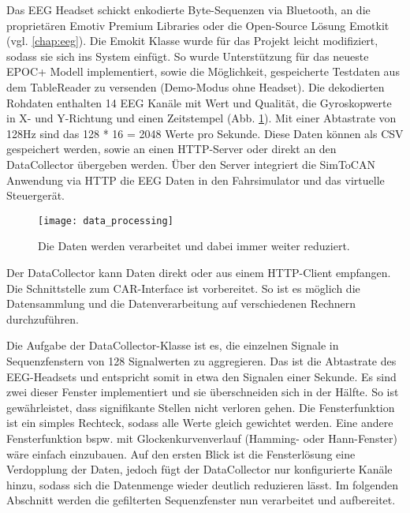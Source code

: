 \label{sec:fetching}
 
Das EEG Headset schickt enkodierte Byte-Sequenzen via Bluetooth, an die proprietären Emotiv Premium Libraries oder die Open-Source Lösung Emotkit (vgl. \ref{chap:eeg}). Die Emokit Klasse wurde für das Projekt leicht modifiziert, sodass sie sich ins System einfügt. So wurde Unterstützung für das neueste EPOC+ Modell implementiert, sowie die Möglichkeit, gespeicherte Testdaten aus dem TableReader zu versenden (Demo-Modus ohne Headset). 
Die dekodierten Rohdaten enthalten 14 EEG Kanäle mit Wert und Qualität, die Gyroskopwerte in X- und Y-Richtung und einen Zeitstempel (Abb. \ref{fig:data_processing}). Mit einer Abtastrate von 128Hz sind das 128 * 16 = 2048 Werte pro Sekunde. Diese Daten können als CSV gespeichert werden, sowie an einen HTTP-Server oder direkt an den DataCollector übergeben werden. Über den Server integriert die SimToCAN Anwendung via HTTP die EEG Daten in den Fahrsimulator und das virtuelle Steuergerät.

\begin{figure}[h] 
  \begin{center}
    \texttt{[image: data\_processing]}
    \caption[Datenverarbeitungskette]{Die Daten werden verarbeitet und dabei immer weiter reduziert. \label{fig:data_processing}}
  \end{center}
\end{figure}

Der DataCollector kann Daten direkt oder aus einem HTTP-Client empfangen. Die Schnittstelle zum CAR-Interface ist vorbereitet. So ist es möglich die Datensammlung und die Datenverarbeitung auf verschiedenen Rechnern durchzuführen.

Die Aufgabe der DataCollector-Klasse ist es, die einzelnen Signale in Sequenzfenstern von 128 Signalwerten zu aggregieren. Das ist die Abtastrate des EEG-Headsets und entspricht somit in etwa den Signalen einer Sekunde. Es sind zwei dieser Fenster implementiert und sie überschneiden sich in der Hälfte. So ist gewährleistet, dass signifikante Stellen nicht verloren gehen. Die Fensterfunktion ist ein simples Rechteck, sodass alle Werte gleich gewichtet werden. Eine andere Fensterfunktion bspw. mit Glockenkurvenverlauf (Hamming- oder Hann-Fenster) wäre einfach einzubauen. Auf den ersten Blick ist die Fensterlösung eine Verdopplung der Daten, jedoch fügt der DataCollector nur konfigurierte Kanäle hinzu, sodass sich die Datenmenge wieder deutlich reduzieren lässt. Im folgenden Abschnitt werden die gefilterten Sequenzfenster nun verarbeitet und aufbereitet.
